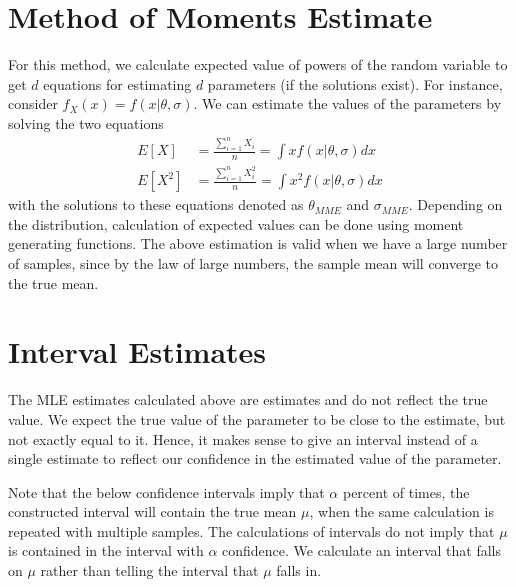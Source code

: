 \documentclass[../probability-notes.tex]{subfiles}
\begin{document}
    \section{Method of Moments Estimate}
    For this method, we calculate expected value of powers of the random variable to get $d$ equations for estimating $d$ parameters (if the solutions exist). For instance, consider $f_{X}(x) = f(x \lvert \theta, \sigma)$. We can estimate the values of the parameters by solving the two equations
    \begin{align*}
        E[X] &= \frac{\sum_{i=1}^{n} X_{i}}{n} = \int xf(x \lvert \theta, \sigma) dx\\
        E[X^{2}] &= \frac{\sum_{i=1}^{n} X_{i}^{2}}{n} = \int x^{2}f(x \lvert \theta, \sigma) dx
    \end{align*}
    with the solutions to these equations denoted as $\theta_{MME}$ and $\sigma_{MME}$. Depending on the distribution, calculation of expected values can be done using moment generating functions. The above estimation is valid when we have a large number of samples, since by the law of large numbers, the sample mean will converge to the true mean.

    \section{Interval Estimates}
    The MLE estimates calculated above are estimates and do not reflect the true value. We expect the true value of the parameter to be close to the estimate, but not exactly equal to it. Hence, it makes sense to give an interval instead of a single estimate to reflect our confidence in the estimated value of the parameter.\newline

    Note that the below confidence intervals imply that $\alpha$ percent of times, the constructed interval will contain the true mean $\mu$, when the same calculation is repeated with multiple samples. The calculations of intervals do not imply that $\mu$ is contained in the interval with $\alpha$ confidence. We calculate an interval that falls on $\mu$ rather than telling the interval that $\mu$ falls in.\newline

\end{document}
